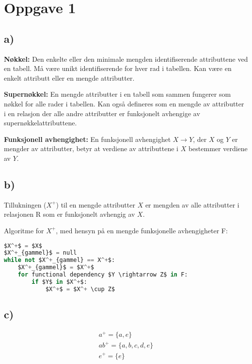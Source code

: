 \documentclass[a4paper, 12pt] {article}
\begin{document}

\newpage

\tableofcontents
\newpage


\section{Oppgave 1}

\subsection{a)}

\textbf{Nøkkel:} Den enkelte eller den minimale mengden identifiserende attributtene ved en tabell. Må være unikt identifiserende for hver rad i tabellen. Kan være en enkelt attributt eller en mengde attributter.


\textbf{Supernøkkel:} En mengde attributter i en tabell som sammen fungerer som nøkkel for alle rader i tabellen. Kan også defineres som en mengde av attributter i en relasjon der alle andre attributter er funksjonelt avhengige av supernøkkelattributtene.


\textbf{Funksjonell avhengighet:} En funksjonell avhengighet $X \rightarrow Y$, der $X$ og $Y$ er mengder av attributter, betyr at verdiene av attributtene i $X$ bestemmer verdiene av $Y$.

\subsection{b)}

Tillukningen ($X^+$) til en mengde attributter $X$ er mengden av alle attributter i relasjonen R som er funksjonelt avhengig av $X$.

Algoritme for $X^+$, med hensyn på en mengde funksjonelle avhengigheter F:

\begin{lstlisting}[language=Python, caption=Tillukningsalgoritme, mathescape]
$X^+$ = $X$
$X^+_{gammel}$ = null
while not $X^+_{gammel} == X^+$:
    $X^+_{gammel}$ = $X^+$
    for functional dependency $Y \rightarrow Z$ in F:
        if $Y$ in $X^+$:
            $X^+$ = $X^+ \cup Z$
\end{lstlisting}

\subsection{c)}

\begin{gather*}
    a^+ = \{a, e\} \\
    ab^+ = \{a, b, c, d, e\} \\
    e^+ = \{e\}
\end{gather*}
\end{document}
